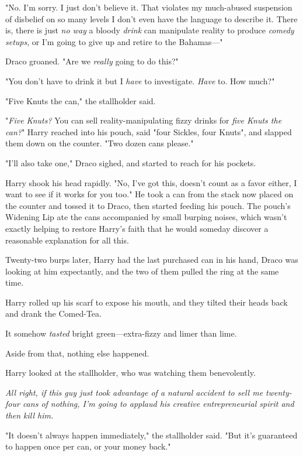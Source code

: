 "No. I'm sorry. I just don't believe it. That violates my much-abused 
suspension of disbelief on so many levels I don't even have the language to 
describe it. There is, there is just \emph{no way} a bloody \emph{drink} can 
manipulate reality to produce \emph{comedy setups}, or I'm going to give up and 
retire to the Bahamas---"

Draco groaned. "Are we \emph{really} going to do this?"

"You don't have to drink it but I \emph{have} to investigate. \emph{Have} to. 
How much?"

"Five Knuts the can," the stallholder said.

"\emph{Five Knuts?} You can sell reality-manipulating fizzy drinks for 
\emph{five Knuts the can?}" Harry reached into his pouch, said "four Sickles, 
four Knuts", and slapped them down on the counter. "Two dozen cans please."

"I'll also take one," Draco sighed, and started to reach for his pockets.

Harry shook his head rapidly. "No, I've got this, doesn't count as a favor 
either, I want to see if it works for you too." He took a can from the stack 
now placed on the counter and tossed it to Draco, then started feeding his 
pouch. The pouch's Widening Lip ate the cans accompanied by small burping 
noises, which wasn't exactly helping to restore Harry's faith that he would 
someday discover a reasonable explanation for all this.

Twenty-two burps later, Harry had the last purchased can in his hand, Draco was 
looking at him expectantly, and the two of them pulled the ring at the same 
time.

Harry rolled up his scarf to expose his mouth, and they tilted their heads back 
and drank the Comed-Tea.

It somehow \emph{tasted} bright green---extra-fizzy and limer than lime.

Aside from that, nothing else happened.

Harry looked at the stallholder, who was watching them benevolently.

\emph{All right, if this guy just took advantage of a natural accident to sell 
me twenty-four cans of nothing, I'm going to applaud his creative 
entrepreneurial spirit and then kill him.}

"It doesn't always happen immediately," the stallholder said. "But it's 
guaranteed to happen once per can, or your money back."

